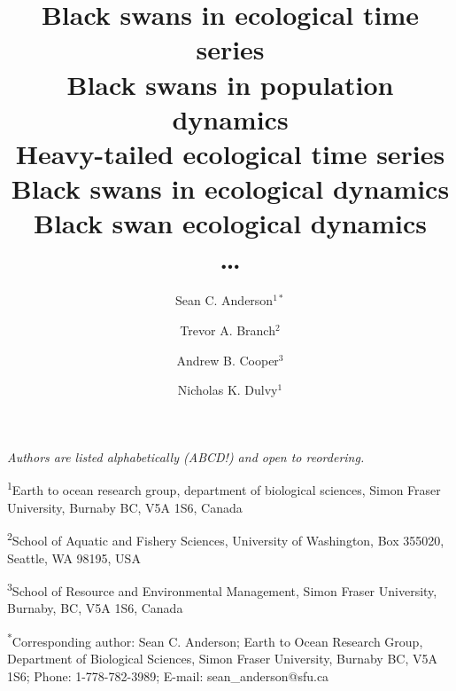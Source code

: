 \documentclass[12pt]{article}
\title{Black swans in ecological time series\\Black swans in population dynamics\\Heavy-tailed ecological time series\\Black swans in ecological dynamics\\Black swan ecological dynamics\\ \ldots}
\author{
Sean C. Anderson$^{1\ast}$ \and
Trevor A. Branch$^2$ \and
Andrew B. Cooper$^3$ \and
Nicholas K. Dulvy$^1$
}
\date{}
\begin{document}
\maketitle
\doublespacing


\noindent
\emph{Authors are listed alphabetically (ABCD!) and open to reordering.}

\noindent
\textsuperscript{1}Earth to ocean research group, department of biological sciences, Simon Fraser University, Burnaby BC, V5A 1S6, Canada

\noindent
\textsuperscript{2}School of Aquatic and Fishery Sciences, University of Washington, Box 355020, Seattle, WA 98195, USA

\noindent
\textsuperscript{3}School of Resource and Environmental Management, Simon Fraser University, Burnaby, BC, V5A 1S6, Canada

\noindent
\textsuperscript{*}Corresponding author: Sean C. Anderson; Earth to Ocean Research Group, Department of Biological Sciences, Simon Fraser University, Burnaby BC, V5A 1S6; Phone: 1-778-782-3989; E-mail: sean\_anderson@sfu.ca

\thispagestyle{empty}

\linenumbers





\renewcommand{\thetable}{S\arabic{table}}
\setcounter{table}{0}




\end{document}
